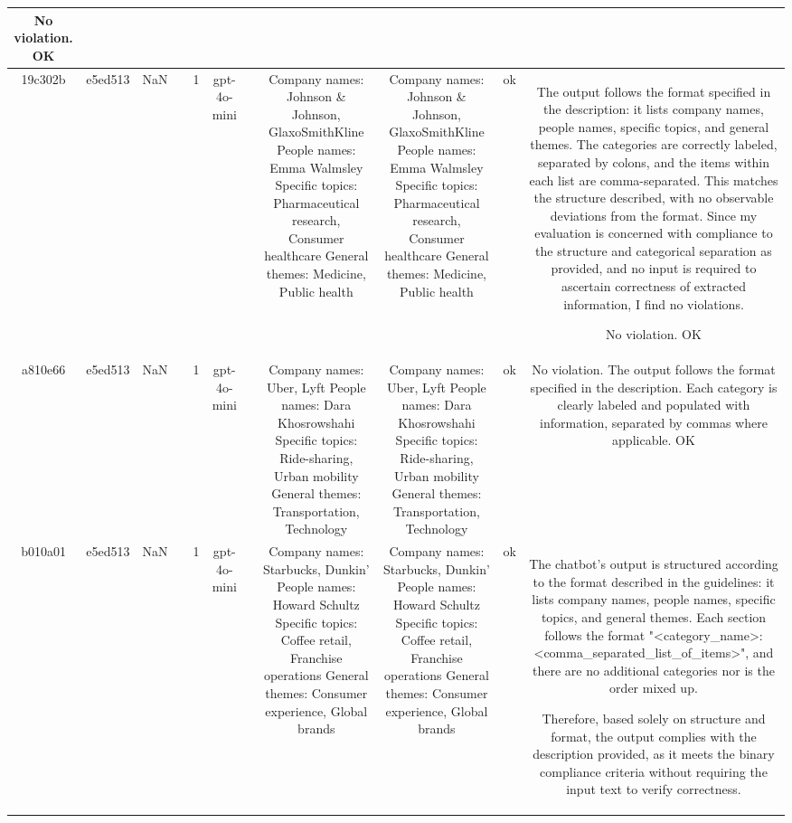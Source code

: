 \begin{table}[h!]
\begin{tabular}{|c|c|c|c|c|c|c|c|c|c|c|}
No violation.
OK\\
\hline
19c302b & e5ed513 & NaN &  & 1 & gpt-4o-mini &  & Company names: Johnson \& Johnson, GlaxoSmithKline
People names: Emma Walmsley
Specific topics: Pharmaceutical research, Consumer healthcare
General themes: Medicine, Public health & Company names: Johnson \& Johnson, GlaxoSmithKline  
People names: Emma Walmsley  
Specific topics: Pharmaceutical research, Consumer healthcare  
General themes: Medicine, Public health   & ok & The output follows the format specified in the description: it lists company names, people names, specific topics, and general themes. The categories are correctly labeled, separated by colons, and the items within each list are comma-separated. This matches the structure described, with no observable deviations from the format. Since my evaluation is concerned with compliance to the structure and categorical separation as provided, and no input is required to ascertain correctness of extracted information, I find no violations.

No violation.
OK\\
\hline
a810e66 & e5ed513 & NaN &  & 1 & gpt-4o-mini &  & Company names: Uber, Lyft
People names: Dara Khosrowshahi
Specific topics: Ride-sharing, Urban mobility
General themes: Transportation, Technology & Company names: Uber, Lyft  
People names: Dara Khosrowshahi  
Specific topics: Ride-sharing, Urban mobility  
General themes: Transportation, Technology   & ok & No violation. The output follows the format specified in the description. Each category is clearly labeled and populated with information, separated by commas where applicable. 
OK\\
\hline
b010a01 & e5ed513 & NaN &  & 1 & gpt-4o-mini &  & Company names: Starbucks, Dunkin'
People names: Howard Schultz
Specific topics: Coffee retail, Franchise operations
General themes: Consumer experience, Global brands & Company names: Starbucks, Dunkin'
People names: Howard Schultz
Specific topics: Coffee retail, Franchise operations
General themes: Consumer experience, Global brands & ok & The chatbot's output is structured according to the format described in the guidelines: it lists company names, people names, specific topics, and general themes. Each section follows the format "<category_name>: <comma_separated_list_of_items>", and there are no additional categories nor is the order mixed up. 

Therefore, based solely on structure and format, the output complies with the description provided, as it meets the binary compliance criteria without requiring the input text to verify correctness.


\end{tabular}
\end{table}
